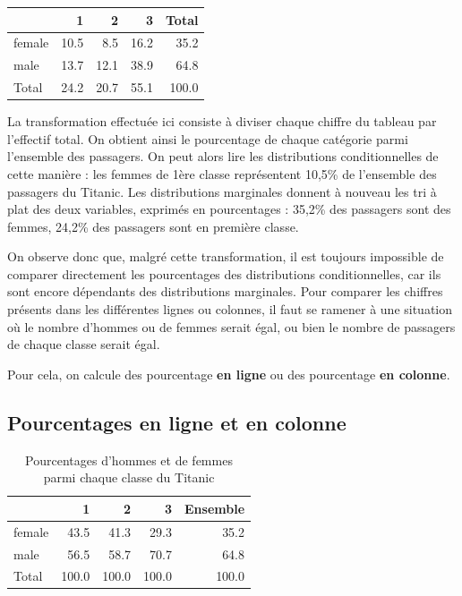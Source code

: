 \documentclass[
  french,
]{book}
\begin{document}
\begin{tabular}{l|r|r|r|r}
\hline
  & 1 & 2 & 3 & Total\\
\hline
female & 10.5 & 8.5 & 16.2 & 35.2\\
\hline
male & 13.7 & 12.1 & 38.9 & 64.8\\
\hline
Total & 24.2 & 20.7 & 55.1 & 100.0\\
\hline
\end{tabular}

La transformation effectuée ici consiste à diviser chaque chiffre du tableau par l'effectif total. On obtient ainsi le pourcentage de chaque catégorie parmi l'ensemble des passagers. On peut alors lire les distributions conditionnelles de cette manière : les femmes de 1ère classe représentent 10,5\% de l'ensemble des passagers du Titanic. Les distributions marginales donnent à nouveau les tri à plat des deux variables, exprimés en pourcentages : 35,2\% des passagers sont des femmes, 24,2\% des passagers sont en première classe.

On observe donc que, malgré cette transformation, il est toujours impossible de comparer directement les pourcentages des distributions conditionnelles, car ils sont encore dépendants des distributions marginales. Pour comparer les chiffres présents dans les différentes lignes ou colonnes, il faut se ramener à une situation où le nombre d'hommes ou de femmes serait égal, ou bien le nombre de passagers de chaque classe serait égal.

Pour cela, on calcule des pourcentage \textbf{en ligne} ou des pourcentage \textbf{en colonne}.

\hypertarget{pourcentages-en-ligne-et-en-colonne}{%
\subsection{Pourcentages en ligne et en colonne}\label{pourcentages-en-ligne-et-en-colonne}}

\begin{table}

\caption{\label{tab:unnamed-chunk-18}Pourcentages d'hommes et de femmes parmi chaque classe du Titanic}
\centering
\begin{tabular}[t]{l|r|r|r|r}
\hline
  & 1 & 2 & 3 & Ensemble\\
\hline
female & 43.5 & 41.3 & 29.3 & 35.2\\
\hline
male & 56.5 & 58.7 & 70.7 & 64.8\\
\hline
Total & 100.0 & 100.0 & 100.0 & 100.0\\
\hline
\end{tabular}
\end{table}
\end{document}
